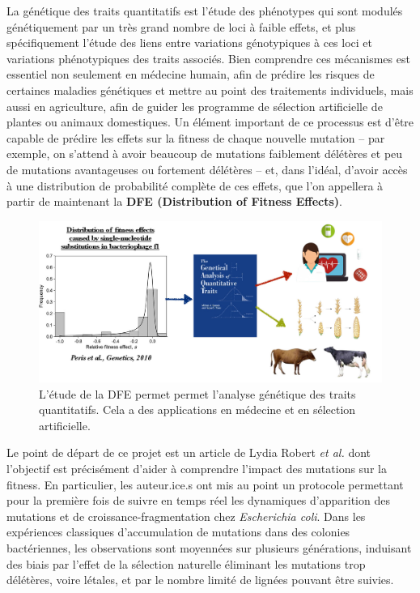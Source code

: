 \documentclass[12pt]{article}
\begin{document}
La génétique des traits quantitatifs \cite{mac} est l'étude des phénotypes qui sont modulés génétiquement par un très grand nombre de loci à faible effets, et plus spécifiquement l'étude des liens entre variations génotypiques à ces loci et variations phénotypiques des traits associés. Bien comprendre ces mécanismes est essentiel non seulement en médecine humain, afin de prédire les risques de certaines maladies génétiques et mettre au point des traitements individuels, mais aussi en agriculture, afin de guider les programme de sélection artificielle de plantes ou animaux domestiques. Un élément important de ce processus est d'être capable de prédire les effets sur la fitness de chaque nouvelle mutation -- par exemple, on s'attend à avoir beaucoup de mutations faiblement délétères et peu de mutations avantageuses ou fortement délétères -- et, dans l'idéal, d'avoir accès à une distribution de probabilité complète de ces effets, que l'on appellera à partir de maintenant la \textbf{DFE (Distribution of Fitness Effects)}.

\begin{figure}[h]
 \begin{center}
	\vspace{3mm}
	\includegraphics[scale=0.25]{../Img/DFE_phage_2010.jpg}
\end{center} 
  \caption{L'étude de la DFE permet permet l'analyse génétique des traits quantitatifs. Cela a des applications en médecine et en sélection artificielle.}
\end{figure}

Le point de départ de ce projet est un article de Lydia Robert \textit{et al.} \cite{rob} dont l'objectif est précisément d'aider à comprendre l’impact des mutations sur la fitness. En particulier, les auteur.ice.s ont mis au point un protocole permettant pour la première fois de suivre en temps réel les dynamiques d’apparition des mutations et de croissance-fragmentation chez \textit{Escherichia coli}. Dans les expériences classiques d’accumulation de mutations dans des colonies bactériennes, les observations sont moyennées sur plusieurs générations, induisant des biais par l’effet de la sélection naturelle éliminant les mutations trop délétères, voire létales, et par le nombre limité de lignées pouvant être suivies. 
\end{document}
